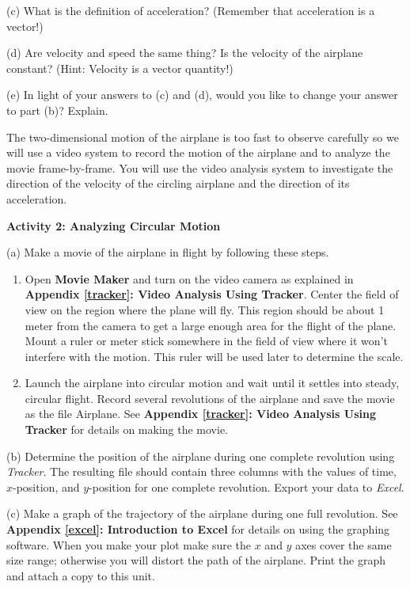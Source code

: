 (c) What is the definition of acceleration? (Remember that acceleration is a vector!)
\vspace{20mm}

(d) Are velocity and speed the same thing? Is the velocity of the airplane constant?
(Hint: Velocity is a vector quantity!)
\vspace{20mm}

(e) In light of your answers to (c) and (d), would you like to change your answer
to part (b)? Explain.
\vspace{20mm}

The two-dimensional motion of the airplane is too fast to observe carefully
so we will use a video system to record the motion of the airplane and to analyze
the movie frame-by-frame. You will use the video analysis system to investigate
the direction of the velocity of the circling airplane and the direction of
its acceleration.

\textbf{Activity 2: Analyzing Circular Motion }

(a) Make a movie of the airplane in flight by following these steps. 

\begin{enumerate}
\item Open \textbf{Movie Maker} and turn on the video camera as explained in \textbf{Appendix \ref{tracker}: Video Analysis Using Tracker}. Center the field of view on the region where the
plane will fly. This region should be about 1 meter from the camera to get a
large enough area for the flight of the plane. Mount a ruler or meter stick
somewhere in the field of view where it won't interfere with the motion. This
ruler will be used later to determine the scale. 
\item Launch the airplane into circular motion and wait until it settles into steady,
circular flight. Record several revolutions of the airplane and save the movie as the file Airplane. See \textbf{Appendix \ref{tracker}: Video Analysis Using Tracker} for details on making the movie.
\end{enumerate}
(b) Determine the position of the airplane during one complete revolution using \textit{Tracker}.  The resulting file should contain three columns with the values of time, $x$-position, and $y$-position for one complete revolution. Export your data to \textit{Excel}.

(c) Make a graph of the trajectory of the airplane during one full revolution.
See \textbf{Appendix \ref{excel}: Introduction to Excel} for details on using
the graphing software. When you make your plot make sure the $x$ and $y$ 
axes cover
the same size range; otherwise you will distort the path of the airplane. Print
the graph and attach a copy to this unit.

